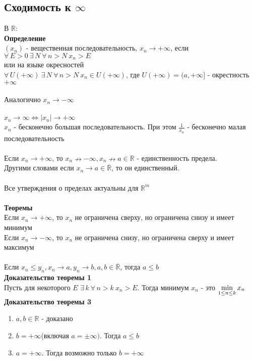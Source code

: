 \documentclass[12pt]{article}
\begin{document}
\subsection{Сходимость к $\infty$}
В $\mathbb{R}$:\\
\textbf{Определение}\\
$(x_n)$ - вещественная последовательность, $x_n \rightarrow +\infty$, если\\
$\forall\,E > 0\ \exists\, N\ \forall\,n>N\ x_n>E$\\
или на языке окресностей\\
$\forall\,U(+\infty)\ \exists\, N\ \forall\,n>N\ x_n\in U(+\infty)$, где $U(+\infty) = (a,+\infty]$ - окрестность $+\infty$\\\\
Аналогично $x_n\rightarrow -\infty$\\\\
$x_n\rightarrow \infty \Leftrightarrow |x_n| \rightarrow +\infty$\\
$x_n$ - бесконечно большая последовательность. При этом $\frac 1{x_n}$ - бесконечно малая последовательность\\\\
Если $x_n\rightarrow+\infty$, то $x_n \nrightarrow -\infty, x_n \nrightarrow a\in \mathbb{R}$ - единственность предела.\\
Другими словами если $x_n \rightarrow a \in \overline{\mathbb{R}}$, то он единственный.\\\\
Все утверждения о пределах актуальны для $\mathbb{R}^m$\\\\
\textbf{Теоремы}\\
Если $x_n\rightarrow +\infty$, то $x_n$ не ограничена сверху, но ограничена снизу и имеет минимум\\
Если $x_n\rightarrow -\infty$, то $x_n$ не ограничена снизу, но ограничена сверху и имеет максимум\\\\
Если $x_n \leq y_n, x_n \rightarrow a, y_n \rightarrow b, a,b\in \overline{\mathbb{R}}$, тогда $a\leq b$\\
\textbf{Доказательство теоремы 1}\\
Пусть для некоторого $E$ $\exists\,k\ \forall\,n>k\ x_n>E$. Тогда минимум $x_n$ - это $\min\limits_{1\leq n \leq k} x_n$\\
\textbf{Доказательство теоремы 3}
\begin{enumerate}
    \item $a,b \in \mathbb{R}$ - доказано
    \item $b=+\infty$(включая $a=\pm\infty)$. Тогда $a\leq b$
    \item $a=+\infty$. Тогда возможно только $b = +\infty$
\end{enumerate}
\end{document}

